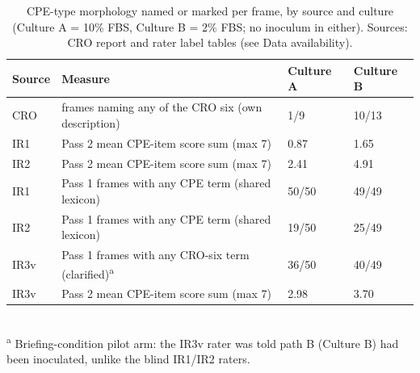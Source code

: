 \begin{table}[htbp]
\centering
\small
\caption{CPE-type morphology named or marked per frame, by source and culture (Culture A = 10\% FBS, Culture B = 2\% FBS; no inoculum in either). Sources: CRO report and rater label tables (see Data availability).}
\label{tab:r3-cpe-by-source}
\begin{tabular}{llll}
\toprule
\textbf{Source} & \textbf{Measure} & \textbf{Culture A} & \textbf{Culture B} \\
\midrule
CRO & frames naming any of the CRO six (own description) & 1/9 & 10/13 \\
IR1 & Pass 2 mean CPE-item score sum (max 7) & 0.87 & 1.65 \\
IR2 & Pass 2 mean CPE-item score sum (max 7) & 2.41 & 4.91 \\
IR1 & Pass 1 frames with any CPE term (shared lexicon) & 50/50 & 49/49 \\
IR2 & Pass 1 frames with any CPE term (shared lexicon) & 19/50 & 25/49 \\
IR3v & Pass 1 frames with any CRO-six term (clarified)\textsuperscript{a} & 36/50 & 40/49 \\
IR3v & Pass 2 mean CPE-item score sum (max 7) & 2.98 & 3.70 \\
\bottomrule
\end{tabular}
\\[2pt]{\footnotesize \textsuperscript{a} Briefing-condition pilot arm: the IR3v rater was told path B (Culture B) had been inoculated, unlike the blind IR1/IR2 raters.}
\end{table}
